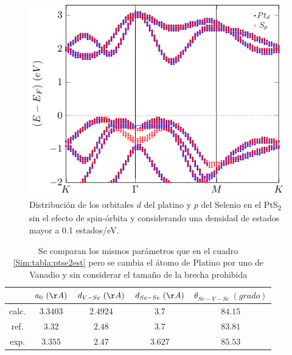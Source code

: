 \begin{figure}[!hbt]
	\centering
	\includegraphics[scale=1]{figRes/PtS2/bandas/celu/projbandas/orbproj.pdf}
	\caption[Distribuci\'on de orbitales $d$ y $p$ del Platino y Selenio respectivamente el ep PtS\textsubscript{2}.]{Distribuci\'on de los orbitales $d$ del platino y $p$ del Selenio en el PtS\textsubscript{2} sin el efecto de spin-\'orbita y considerando una densidad de estados mayor a 0.1 estados/eV. }
	\label{Sim:fig:pdosPts2cU}
\end{figure}

\begin{table}
	\centering
	\caption[Comparaci\'on de par\'ametros estructurales del VSe\textsubscript{2}.]{Se comparan los mismos par\'ametros que en el cuadro \ref{Sim:tabla:ptse2est} pero se cambia el \'atomo de Platino por uno de Vanadio  y sin considerar el tama\~no de la brecha prohibida}
	\begin{tabular}{|c|c|c|c|c|}
		\hline
		& $a_0~(\AA)$   & $d_{V-Se}~(\AA)$  & $d_{Se-Se}~(\AA)$  &  $\theta_{Se-V-Se}~(grado)$ \\
		\hline
		\hline
		calc.   & $3.3403$& $2.4924 $     & $3.7 $  & $84.15$ \\
		ref. \cite{doi:10.1021/jp405808a}    & $3.32$& $2.48 $     & $3.7 $  & $83.81$ \\
		exp. \cite{expVse}   & $3.355$& $2.47 $     & $3.627 $  & $85.53$\\
		\hline
		
	\end{tabular}
	\label{Sim:tabla:VSe2est}
\end{table}
